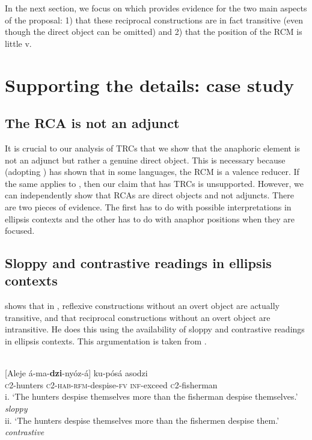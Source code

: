 \documentclass[output=paper]{langsci/langscibook}
\begin{document}
In the next section, we focus on  which provides evidence for the two main aspects of the proposal: 1) that these reciprocal constructions are in fact transitive (even though the direct object can be omitted) and 2) that the position of the RCM is little v.

\section{Supporting the details:  case study}\label{sec:safir:4}
\subsection{The RCA is not an adjunct}

It is crucial to our analysis of TRCs that we show that the anaphoric element is not an adjunct but rather a genuine direct object. This is necessary because \citet{Mchombo2004} (adopting \citealt{ReinhartReuland1993}) has shown that in some  languages, the RCM is a valence reducer. If the same applies to , then our claim that  has TRCs is unsupported. However, we can independently show that  RCAs are direct objects and not adjuncts. There are two pieces of evidence. The first has to do with possible interpretations in ellipsis contexts and the other has to do with anaphor positions when they are focused.

\subsection{Sloppy and contrastive readings in ellipsis contexts}

\citet[106]{Mchombo2004} shows that in , reflexive constructions without an overt object are actually transitive, and that reciprocal constructions without an overt object are intransitive. He does this using the availability of sloppy and contrastive readings in ellipsis contexts. This argumentation is taken from \citet{SellsEtAl1987}.



\ea\label{ex:safir:11}
\\
\gll {}[Aleje    á-ma-\textbf{{dzi}}{-nyóz-á}] ku-pósá   asodzi \\
  \textsc{c}2-hunters   \textsc{c2-hab-}\textsc{rfm}-despise-\textsc{fv}   \textsc{inf}-exceed   \textsc{c}2-fisherman\\
\glt i. ‘The hunters despise themselves more than the fisherman despise themselves.’ \textit{sloppy} \\
\glt ii. ‘The hunters despise themselves more than the fishermen despise them.’    \textit{contrastive}
\z
\end{document}
